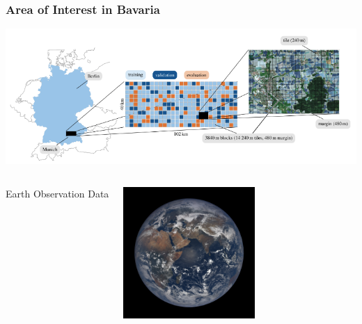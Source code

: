 \begin{frame}
\frametitle{Area of Interest in Bavaria}
\includegraphics[width=\textwidth]{images/aoi}
%
\end{frame}


{
	\begin{frame}[plain]
	
	\vfill
	\Huge\color{white}
	\begin{center}
		\begin{columns}
			\vspace{7em}
			
			\hfill 
			Earth Observation Data
			
			\includegraphics[width=5cm]{images/epic1}
		\end{columns}
	\end{center}
	
	\vfill
\end{frame}
}

